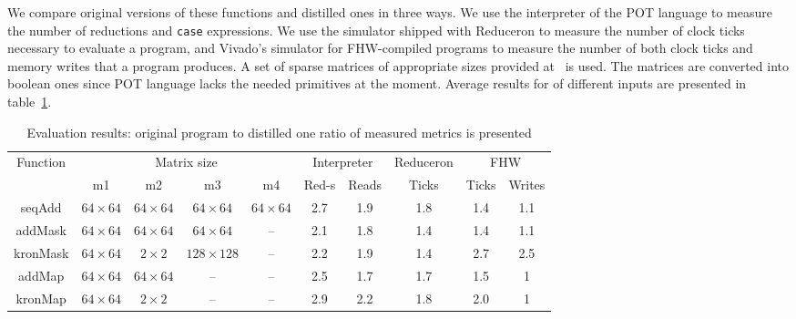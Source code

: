 We compare original versions of these functions and distilled ones in three ways.
We use the interpreter of the POT language to measure the number of reductions and  \verb|case| expressions.
We use the simulator shipped with Reduceron to measure the number of clock ticks necessary to evaluate a program, and Vivado's simulator for FHW-compiled programs to measure the number of both clock ticks and memory writes that a program produces.
A set of sparse matrices of appropriate sizes provided at~\cite{Matrices} is used. 
The matrices are converted into boolean ones since POT language lacks the needed primitives at the moment.
Average results for  of different inputs are presented in table~\ref{tbl:evaluationResults}.

\begin{table}[ht]
    \centering    
    \begin{tabular}{|c|c|c|c|c||c|c|c|c|c|}
        \hline
        \multirow{2}{*}{Function} &  \multicolumn{4}{c||}{Matrix size}  & \multicolumn{2}{c|}{Interpreter}            & Reduceron & \multicolumn{2}{c|}{FHW}\\
        \cline{2-10}
                                  &   m1 & m2 & m3 & m4                & Red-s & Reads                               & Ticks     & Ticks & Writes \\
        \hline
        \hline
        seqAdd   & $64 \times 64$ & $64 \times 64$ & $64 \times 64$ & $64 \times 64$ & 2.7          & 1.9        & 1.8 & 1.4 & 1.1 \\ 
        addMask  & $64 \times 64$ & $64 \times 64$ & $64 \times 64$ & --             & 2.1          & 1.8        & 1.4 & 1.4 & 1.1\\ 
        kronMask & $64 \times 64$ & $2 \times 2$   &$128 \times 128$& --             & 2.2          & 1.9        & 1.4 & 2.7 & 2.5\\ 
        addMap   & $64 \times 64$ & $64 \times 64$ & --             & --             & 2.5          & 1.7        & 1.7 & 1.5 & 1\\
        kronMap  & $64 \times 64$ & $2 \times 2$   & --             & --             & 2.9          & 2.2        & 1.8 & 2.0 & 1\\ 
        \hline
        
    \end{tabular}
    \caption{Evaluation results: original program to distilled one ratio of measured metrics is presented}
    \label{tbl:evaluationResults}
\end{table}

